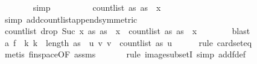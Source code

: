 \begin{isabellebody}
\ \ \ \ \ \ \isamarkupfalse%
\ {\isacharparenleft}{\kern0pt}simp{\isacharparenright}{\kern0pt}\isanewline
\ \ \ \ \isamarkupfalse%
\ \isamarkupfalse%
\ {\isachardoublequoteopen}{\isachardot}{\kern0pt}{\isachardot}{\kern0pt}{\isachardot}{\kern0pt}\ {\isacharequal}{\kern0pt}\ count{\isacharunderscore}{\kern0pt}list\ as\ {\isacharparenleft}{\kern0pt}as\ {\isacharbang}{\kern0pt}\ x{\isacharparenright}{\kern0pt}{\isachardoublequoteclose}\isanewline
\ \ \ \ \ \ \isamarkupfalse%
\ {\isacharparenleft}{\kern0pt}simp\ add{\isacharcolon}{\kern0pt}count{\isacharunderscore}{\kern0pt}list{\isacharunderscore}{\kern0pt}append{\isacharbrackleft}{\kern0pt}symmetric{\isacharbrackright}{\kern0pt}{\isacharparenright}{\kern0pt}\isanewline
\ \ \ \ \isamarkupfalse%
\ \isamarkupfalse%
\ {\isachardoublequoteopen}count{\isacharunderscore}{\kern0pt}list\ {\isacharparenleft}{\kern0pt}drop\ {\isacharparenleft}{\kern0pt}Suc\ x{\isacharparenright}{\kern0pt}\ as{\isacharparenright}{\kern0pt}\ {\isacharparenleft}{\kern0pt}as\ {\isacharbang}{\kern0pt}\ x{\isacharparenright}{\kern0pt}\ {\isacharless}{\kern0pt}\ count{\isacharunderscore}{\kern0pt}list\ as\ {\isacharparenleft}{\kern0pt}as\ {\isacharbang}{\kern0pt}\ x{\isacharparenright}{\kern0pt}{\isachardoublequoteclose}\isanewline
\ \ \ \ \ \ \isamarkupfalse%
\ blast\isanewline
\ \ \isamarkupfalse%
\isanewline
\ \ \isamarkupfalse%
\ a{}{\isacharcolon}{\kern0pt}\ {\isachardoublequoteopen}f\ {\isacharbackquote}{\kern0pt}\ {\isacharbraceleft}{\kern0pt}k{\isachardot}{\kern0pt}\ k\ {\isacharless}{\kern0pt}\ length\ as{\isacharbraceright}{\kern0pt}\ {\isacharequal}{\kern0pt}\ {\isacharbraceleft}{\kern0pt}{\isacharparenleft}{\kern0pt}u{\isacharcomma}{\kern0pt}\ v{\isacharparenright}{\kern0pt}{\isachardot}{\kern0pt}\ v\ {\isacharless}{\kern0pt}\ count{\isacharunderscore}{\kern0pt}list\ as\ u{\isacharbraceright}{\kern0pt}{\isachardoublequoteclose}\isanewline
\ \ \ \ \isamarkupfalse%
\ {\isacharparenleft}{\kern0pt}rule\ card{\isacharunderscore}{\kern0pt}seteq{\isacharparenright}{\kern0pt}\ \isanewline
\ \ \ \ \ \ \isamarkupfalse%
\ {\isacharparenleft}{\kern0pt}metis\ fin{\isacharunderscore}{\kern0pt}space{\isacharbrackleft}{\kern0pt}OF\ assms{\isacharparenleft}{\kern0pt}{}{\isacharparenright}{\kern0pt}{\isacharbrackright}{\kern0pt}{\isacharparenright}{\kern0pt}\isanewline
\ \ \ \ \ \isamarkupfalse%
\ {\isacharparenleft}{\kern0pt}rule\ image{\isacharunderscore}{\kern0pt}subsetI{\isacharcomma}{\kern0pt}\ simp\ add{\isacharcolon}{\kern0pt}f{\isacharunderscore}{\kern0pt}def{\isacharparenright}{\kern0pt}\isanewline

\end{isabellebody}
